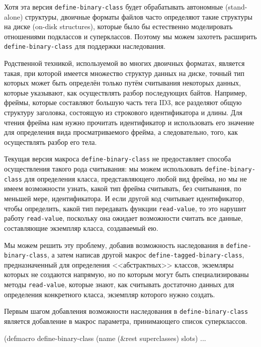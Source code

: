 Хотя эта версия \lstinline{define-binary-class} будет обрабатывать автономные (stand-alone)
структуры, двоичные форматы файлов часто определяют такие структуры на диске (on-disk
structures), которые было бы естественно моделировать отношениями подклассов и
суперклассов. Поэтому мы можем захотеть расширить \lstinline{define-binary-class} для поддержки
наследования.

Родственной техникой, используемой во многих двоичных форматах, является такая, при
которой имеется множество структур данных на диске, точный тип которых может быть
определён только путём считывания некоторых данных, которые указывают, как осуществлять
разбор последующих байтов. Например, фреймы, которые составляют большую часть тега ID3,
все разделяют общую структуру заголовка, состоящую из строкового идентификатора и
длины. Для чтения фрейма нам нужно прочитать идентификатор и использовать его значение для
определения вида просматриваемого фрейма, а следовательно, того, как осуществлять разбор
его тела.

Текущая версия макроса \lstinline{define-binary-class} не предоставляет способа осуществления
такого рода считывания: мы можем использовать \lstinline{define-binary-class} для определения
класса, представляющего любой вид фрейма, но мы не имеем возможности узнать, какой тип
фрейма считывать, без считывания, по меньшей мере, идентификатора. И если другой код
считывает идентификатор, чтобы определить, какой тип передавать функции \lstinline{read-value},
то это нарушит работу \lstinline{read-value}, поскольку она ожидает возможности считать все
данные, составляющие экземпляр класса, создаваемый ею.

Мы можем решить эту проблему, добавив возможность наследования в
\lstinline{define-binary-class}, а затем написав другой макрос
\lstinline{define-tagged-binary-class}, предназначенный для определения <<абстрактных>>
классов, экземляры которых не создаются напрямую, но по которым могут быть
специализированы методы \lstinline{read-value}, которые знают, как считывать достаточно данных
для определения конкретного класса, экземпляр которого нужно создать.

Первым шагом добавления возможности наследования в \lstinline{define-binary-class} является
добавление в макрос параметра, принимающего список суперклассов.

\begin{myverb}
(defmacro define-binary-class (name (&rest superclasses) slots) ...
\end{myverb}

